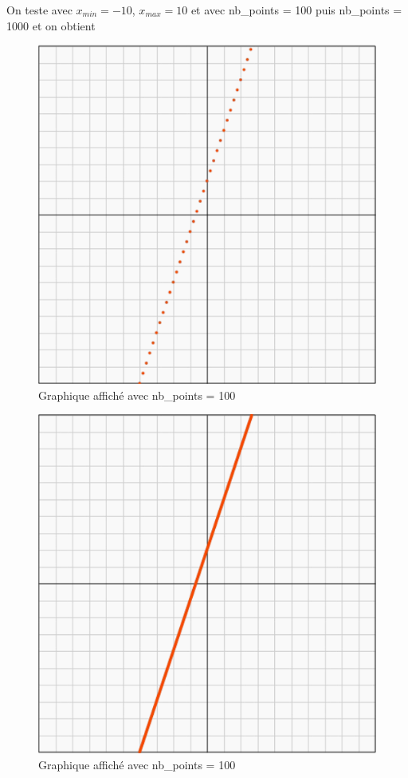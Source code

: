 \begin{exemple}
\begin{algobox}
\end{algobox}
On teste avec $x_{min}=-10$, $x_{max} = 10$ et avec nb\_points = 100 puis nb\_points = 1000 et on obtient 
\begin{figure}[H]
\centering
\includegraphics[scale=0.3]{images/trace_3x2_graph1.png}
\caption{Graphique affiché avec nb\_points = 100}
\end{figure}
\begin{figure}[H]
\centering
\includegraphics[scale=0.3]{images/trace_3x2_graph2.png}
\caption{Graphique affiché avec nb\_points = 100}
\end{figure}
\end{exemple}
